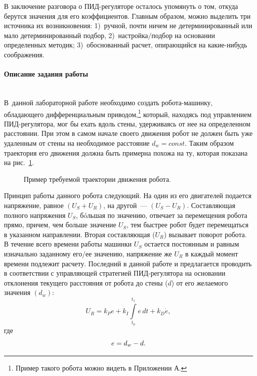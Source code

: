 \documentclass[12pt,a4paper,openany]{extarticle}
\begin{document}
В заключение разговора о ПИД-регуляторе осталось упомянуть о том, откуда берутся значения для его коэффициентов.
Главным образом, можно выделить три источника их возникновения: 1)~ручной, почти ничем не детерминированный или мало детерминированный подбор, 2)~настройка/подбор на основании определенных методик; 3)~обоснованный расчет, опирающийся на какие-нибудь соображения.

\paragraph*{Описание задания работы}$\phantom{-}$\\
\hspace*{\parindent}В~данной лабораторной работе необходимо создать робота-машинку, обладающего дифференциальным приводом\lefteqn,\footnote{Пример такого робота можно видеть в Приложении А.} который, находясь под управлением ПИД-регулятора, мог бы ехать вдоль стены, удерживаясь от нее на определенном расстоянии.
При этом в самом начале своего движения робот не должен быть уже удаленным от стены на необходимое расстояние $d_w=const$.
Таким образом траектория его движения должна быть примерна похожа на ту, которая показана на рис.~\ref{fig:example_of_robots_trajectory}.

\begin{figure}[h!]
	\caption{Пример требуемой траектории движения робота.}
	\label{fig:example_of_robots_trajectory}
\end{figure}	

Принцип работы данного робота следующий.
На один из его двигателей подается напряжение, равное $(U_S+U_R)$, на другой~--- $(U_S-U_R)$.
Составляющая полного напряжения $U_S$, б\'oльшая по значению, отвечает за перемещения робота прямо, причем, чем больше значение $U_S$, тем быстрее робот будет перемещаться в указанном направлении.
Вторая составляющая ($U_R$) вызывает поворот робота.
В течение всего времени работы машинки $U_S$ остается постоянным и равным изначально заданному его/ее значению, напряжение же $U_R$ в каждый момент времени подлежит расчету.
Последний в данной работе и предлагается проводить в соответствии с управляющей стратегией ПИД-регулятора на основании отклонения текущего расстояния от робота до стены ($d$) от его желаемого значения $(d_w)$:
\begin{equation}
U_R = k_Pe + k_I\int\limits_{t_0}^{t_1} \!e\,dt + k_D\dot{e},
\end{equation}
где 
\begin{equation}
e = d_w - d\ldotp
\end{equation}
\end{document}
